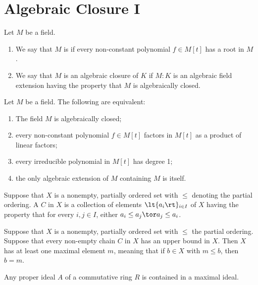 \documentclass[a4paper]{article}
\begin{document}
\section{Algebraic Closure I}
\begin{tdefinition}
  Let $ M $ be a field. \begin{enumerate}[label=(\roman*)]
    \item We say that $ M $ is  if every non-constant polynomial $ f\in M[t] $ has a root in $ M $.
    \item We say that $ M $ is an algebraic closure of $ K $ if $ M:K $ is an algebraic field extension having the property that $ M $ is algebraically closed.
  \end{enumerate}
\end{tdefinition}

\begin{tlemma}
  Let $ M $ be a field.
  The following are equivalent: \begin{enumerate}[label=(\roman*)]
    \item The field $ M $ is algebraically closed;
    \item every non-constant polynomial $ f\in M[t] $ factors in $ M[t] $ as a product of linear factors;
    \item every irreducible polynomial in $ M[t] $ has degree 1;
    \item the only algebraic extension of $ M $ containing $ M $ is itself.
  \end{enumerate}
\end{tlemma}

\begin{tdefinition}[Chain]
  Suppose that $ X $ is a nonempty, partially ordered set with $ \leq $ denoting the partial ordering.
  A  $ C $ in $ X $ is a collection of elements $ \lt\{ a_i \rt\}_{i\in I} $ of $ X $ having the property that for every $ i,j\in I $, either $ a_i\leq a_j \tor a_j\leq a_i $.
\end{tdefinition}

\quad Suppose that $ X $ is a nonempty, partially ordered set with $ \leq $ the partial ordering.
Suppose that every non-empty chain $ C $ in $ X $ has an upper bound in $ X $.
Then $ X $ has at least one maximal element $ m $, meaning that if $ b\in X $ with $ m\leq b $, then $ b=m $.

\begin{tcorollary}
  Any proper ideal $ A $ of a commutative ring $ R $ is contained in a maximal ideal.
\end{tcorollary}
\end{document}
